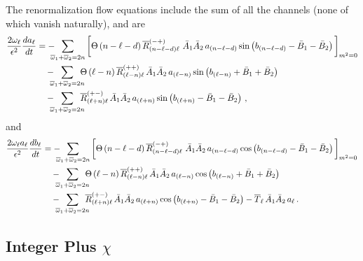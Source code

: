 \documentclass[../PhD.tex]{subfiles}
\newcommand{\oone}{\overline{\omega}_1}
\newcommand{\otwo}{\overline{\omega}_2}
\begin{document}
The renormalization flow equations include the sum of all the channels (none of which vanish naturally), and are
\begin{align}
\frac{2 \ol}{\epsilon^2} \frac{d a_\ell}{d t} &= - \!\!\!\! \sum_{\oone + \otwo = 2n}\bigg[ \Theta\left( n - \ell - d \right) \overline{R}^{(-+)}_{(n - \ell - d) \ell} \ \bar A_1 \bar A_2 \, a_{(n - \ell - d)} \sin \left( b_{(n - \ell - d)} - \bar B_1 - \bar B_2 \right) \bigg]_{m^2 = 0}  \nonumber \\ 
%
& \quad - \!\!\!\! \sum_{\oone + \otwo = 2n} \!\!\!\! \Theta \left( \ell - n \right)  \overline{R}^{(++)}_{(\ell - n)\ell} \, \bar A_1 \bar A_2 \, a_{(\ell - n)} \sin \left( b_{(\ell - n)} + \bar B_1 + \bar B_2 \right) \nonumber \\
%
& \quad  - \!\!\!\! \sum_{\oone + \otwo = 2n} \!\!\!\! \overline{R}^{(+-)}_{(\ell + n) \ell} \, \bar A_1 \bar A_2 \, a_{(\ell + n)} \sin \left( b_{(\ell + n)} - \bar B_1 - \bar B_2 \right) \, ,
\end{align}
and
\begin{align}
\frac{2 \ol a_\ell}{\epsilon^2} \frac{d b_\ell}{d t} &= - \!\!\!\! \sum_{\oone + \otwo = 2n}\bigg[ \Theta\left( n - \ell - d \right) \overline{R}^{(-+)}_{(n - \ell - d) \ell} \ \bar A_1 \bar A_2 \, a_{(n - \ell - d)} \cos \left( b_{(n - \ell - d)} - \bar B_1 - \bar B_2 \right) \bigg]_{m^2 = 0}  \nonumber \\ 
%
& \quad - \!\!\!\! \sum_{\oone + \otwo = 2n} \!\!\!\! \Theta \left( \ell - n \right)  \overline{R}^{(++)}_{(\ell - n)\ell} \, \bar A_1 \bar A_2 \, a_{(\ell - n)} \cos \left( b_{(\ell - n)} + \bar B_1 + \bar B_2 \right) \nonumber \\
%
& \quad  - \!\!\!\! \sum_{\oone + \otwo = 2n} \!\!\!\! \overline{R}^{(+-)}_{(\ell + n) \ell} \, \bar A_1 \bar A_2 \, a_{(\ell + n)} \cos \left( b_{(\ell + n)} - \bar B_1 - \bar B_2 \right) - \overline{T}_{\ell} \, \bar A_1 \bar A_2 \, a_\ell \, .
\end{align}

\subsection{Integer Plus $\chi$}
\label{ssec: intpluschi}
\end{document}
